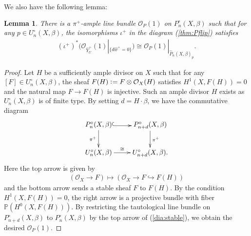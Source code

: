 \documentclass[11pt]{amsart}
\theoremstyle{plain}
\newtheorem{lem}[thm]{Lemma}
\newcommand{\oO}{\mathcal{O}}
\begin{document}
We also have the following lemma:  
\begin{lem}\label{lem:O1}
There is a $\pi^+$-ample line bundle 
$\oO_P(1)$ on $P_n^{\circ}(X, \beta)$ such that
for any $p \in U_n^{\circ}(X, \beta)$, 
the isomorphisms $\iota^{+}$ in the diagram 
(\ref{thm:Pflip})
satisfies
\begin{align*}
(\iota^{+})^{\ast}(\oO_{\widehat{Y}_U^{+}}(1)|_{\{d\widehat{w}^{+}=0\}})
\cong \oO_{P}(1)|_{\widehat{P}_n(X, \beta)_p}. 
\end{align*}
\end{lem}
\begin{proof}
Let $H$ be a sufficiently ample divisor on $X$ such that 
for any $[F] \in U_n^{\circ}(X, \beta)$, 
the sheaf $F(H) \cneq F \otimes \oO_X(H)$
satisfies  
$H^1(X, F(H))=0$ 
and the natural map 
$F \to F(H)$ is injective. 
Such an ample divisor $H$ exists as $U_n^{\circ}(X, \beta)$ is of finite type. 
By setting $d=H \cdot \beta$, we have the commutative diagram
\begin{align}\label{dia:stable}
\xymatrix{
P_n^{\circ}(X, \beta) 
 \ar@<-0.3ex>@{^{(}->}[r] \ar[d]_-{\pi^+}
& P_{n+d}^{\circ}(X, \beta)
\ar[d]^-{\pi^+} \\
U_n^{\circ}(X, \beta) \ar[r]^-{\cong}
& U_{n+d}^{\circ}(X, \beta).
}
\end{align}
Here the top arrow is given by 
\begin{align*}
(\oO_X \to F)
\mapsto 
(\oO_X \to F \hookrightarrow F(H))
\end{align*}
and the bottom arrow 
sends a stable sheaf $F$ to $F(H)$. 
By the condition $H^1(X, F(H))=0$, the right
arrow is a projective bundle with fiber $\mathbb{P}(H^0(X, F(H)))$. 
By restricting the tautological 
line bundle on $P_{n+d}^{\circ}(X, \beta)$
to
$P_n^{\circ}(X, \beta)$ by the 
top arrow of (\ref{dia:stable}), we obtain the 
desired $\oO_P(1)$. 
\end{proof}
\end{document}
